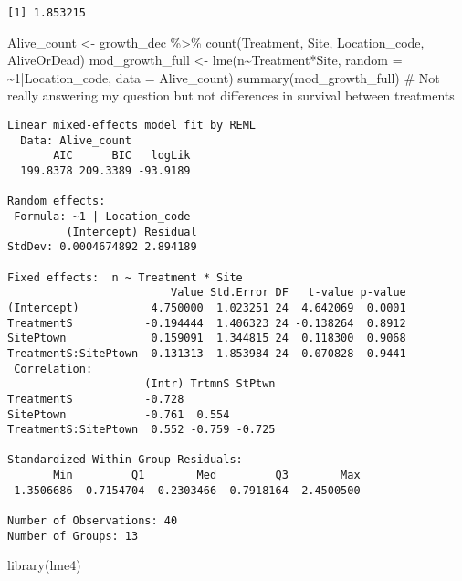 \documentclass[
  letterpaper,
  DIV=11,
  numbers=noendperiod]{scrartcl}
\newenvironment{Shaded}{\begin{snugshade}}{\end{snugshade}}
\newcommand{\AttributeTok}[1]{\textcolor[rgb]{0.40,0.45,0.13}{#1}}
\newcommand{\CommentTok}[1]{\textcolor[rgb]{0.37,0.37,0.37}{#1}}
\newcommand{\DecValTok}[1]{\textcolor[rgb]{0.68,0.00,0.00}{#1}}
\newcommand{\FunctionTok}[1]{\textcolor[rgb]{0.28,0.35,0.67}{#1}}
\newcommand{\NormalTok}[1]{\textcolor[rgb]{0.00,0.23,0.31}{#1}}
\newcommand{\OtherTok}[1]{\textcolor[rgb]{0.00,0.23,0.31}{#1}}
\newcommand{\SpecialCharTok}[1]{\textcolor[rgb]{0.37,0.37,0.37}{#1}}
\begin{document}
\begin{verbatim}
[1] 1.853215
\end{verbatim}

\begin{Shaded}
\begin{Highlighting}[]
\NormalTok{Alive\_count }\OtherTok{\textless{}{-}}\NormalTok{ growth\_dec }\SpecialCharTok{\%\textgreater{}\%} \FunctionTok{count}\NormalTok{(Treatment, Site, Location\_code, AliveOrDead)}
\NormalTok{mod\_growth\_full }\OtherTok{\textless{}{-}} \FunctionTok{lme}\NormalTok{(n}\SpecialCharTok{\textasciitilde{}}\NormalTok{Treatment}\SpecialCharTok{*}\NormalTok{Site, }
                       \AttributeTok{random =} \SpecialCharTok{\textasciitilde{}}\DecValTok{1}\SpecialCharTok{|}\NormalTok{Location\_code, }\AttributeTok{data =}\NormalTok{ Alive\_count)}
\FunctionTok{summary}\NormalTok{(mod\_growth\_full) }\CommentTok{\# Not really answering my question but not differences in survival between treatments}
\end{Highlighting}
\end{Shaded}

\begin{verbatim}
Linear mixed-effects model fit by REML
  Data: Alive_count 
       AIC      BIC   logLik
  199.8378 209.3389 -93.9189

Random effects:
 Formula: ~1 | Location_code
         (Intercept) Residual
StdDev: 0.0004674892 2.894189

Fixed effects:  n ~ Treatment * Site 
                         Value Std.Error DF   t-value p-value
(Intercept)           4.750000  1.023251 24  4.642069  0.0001
TreatmentS           -0.194444  1.406323 24 -0.138264  0.8912
SitePtown             0.159091  1.344815 24  0.118300  0.9068
TreatmentS:SitePtown -0.131313  1.853984 24 -0.070828  0.9441
 Correlation: 
                     (Intr) TrtmnS StPtwn
TreatmentS           -0.728              
SitePtown            -0.761  0.554       
TreatmentS:SitePtown  0.552 -0.759 -0.725

Standardized Within-Group Residuals:
       Min         Q1        Med         Q3        Max 
-1.3506686 -0.7154704 -0.2303466  0.7918164  2.4500500 

Number of Observations: 40
Number of Groups: 13 
\end{verbatim}

\begin{Shaded}
\begin{Highlighting}[]
\FunctionTok{library}\NormalTok{(lme4)}
\end{Highlighting}
\end{Shaded}
\end{document}
